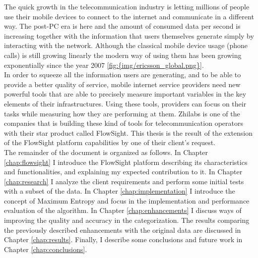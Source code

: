 
The quick growth in the telecommunication industry is letting millions of people use their mobile devices to connect to the internet and communicate in a different way. The post-PC era is here and
the amount of consumed data per second is increasing together with the information that users themselves generate simply by interacting with the network.
Although the classical mobile device usage (phone calls) is still growing linearly the modern way of using them has been growing exponentially since the year 2007 \ref{fig:{img/ericsson_global.png}}.
 \\
In order to squeeze all the information users are generating, and to be able to provide a better quality of service, mobile internet service providers need new powerful tools that are able to precisely
measure important variables in the key elements of their infrastructures. Using these tools, providers can focus on their tasks while measuring how they are performing at them.
Zhilabs is one of the companies that is building these kind of tools for telecommunication operators with their star product called FlowSight\cite{flowsight}. 
This thesis is the result of the extension of the FlowSight platform capabilities by one of their client's request.  \\ 
The remainder of the document is organized as follows. In Chapter \ref{chap:flowsight} I introduce the FlowSight platform describing its characteristics and functionalities, and explaining my
expected contribution to it. In Chapter \ref{chap:research} I analyze the client requirements and perform some initial tests with a subset of the data. In Chapter \ref{chap:implementation} I introduce
the concept of Maximum Entropy and focus in the implementation and performance evaluation of the algorithm. In Chapter \ref{chap:enhancements} I discuss ways of improving the quality and accuracy
in the categorization. The results comparing the previously described enhancements with the original data are discussed in Chapter \ref{chap:results}. Finally, I describe some conclusions and future 
work in Chapter \ref{chap:conclusions}.
